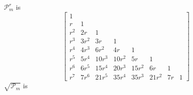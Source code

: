 $\mathcal{P}_{m}^{r}$ is
\begin{displaymath}
\left[\begin{matrix}1 &   &   &   &   &   &   &  \\r & 1 &   &   &   &   &   &  \\r^{2} & 2 r & 1 &   &   &   &   &  \\r^{3} & 3 r^{2} & 3 r & 1 &   &   &   &  \\r^{4} & 4 r^{3} & 6 r^{2} & 4 r & 1 &   &   &  \\r^{5} & 5 r^{4} & 10 r^{3} & 10 r^{2} & 5 r & 1 &   &  \\r^{6} & 6 r^{5} & 15 r^{4} & 20 r^{3} & 15 r^{2} & 6 r & 1 &  \\r^{7} & 7 r^{6} & 21 r^{5} & 35 r^{4} & 35 r^{3} & 21 r^{2} & 7 r & 1\end{matrix}\right]
\end{displaymath}
$\sqrt{\mathcal{P}_{m}}$ is
